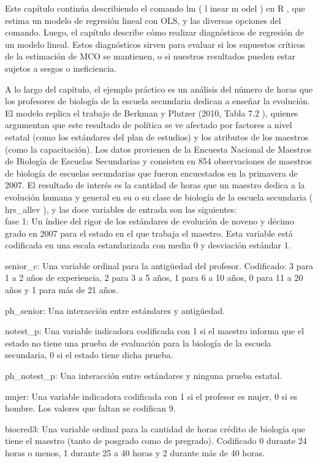 \documentclass[
]{book}
\begin{document}
Este capítulo continúa describiendo el comando lm ( l inear m odel ) en R , que estima un modelo de regresión lineal con OLS, y las diversas opciones del comando. Luego, el capítulo describe cómo realizar diagnósticos de regresión de un modelo lineal. Estos diagnósticos sirven para evaluar si los supuestos críticos de la estimación de MCO se mantienen, o si nuestros resultados pueden estar sujetos a sesgos o ineficiencia.

A lo largo del capítulo, el ejemplo práctico es un análisis del número de horas que los profesores de biología de la escuela secundaria dedican a enseñar la evolución. El modelo replica el trabajo de Berkman y Plutzer (2010, Tabla 7.2 ), quienes argumentan que este resultado de política se ve afectado por factores a nivel estatal (como los estándares del plan de estudios) y los atributos de los maestros (como la capacitación). Los datos provienen de la Encuesta Nacional de Maestros de Biología de Escuelas Secundarias y consisten en 854 observaciones de maestros de biología de escuelas secundarias que fueron encuestados en la primavera de 2007. El resultado de interés es la cantidad de horas que un maestro dedica a la evolución humana y general en su o su clase de biología de la escuela secundaria ( hrs\_allev ), y las doce variables de entrada son las siguientes:\\
fase 1:
Un índice del rigor de los estándares de evolución de noveno y décimo grado en 2007 para el estado en el que trabaja el maestro. Esta variable está codificada en una escala estandarizada con media 0 y desviación estándar 1.

senior\_c:
Una variable ordinal para la antigüedad del profesor. Codificado: 3 para 1 a 2 años de experiencia, 2 para 3 a 5 años, 1 para 6 a 10 años, 0 para 11 a 20 años y 1 para más de 21 años.

ph\_senior:
Una interacción entre estándares y antigüedad.

notest\_p:
Una variable indicadora codificada con 1 si el maestro informa que el estado no tiene una prueba de evaluación para la biología de la escuela secundaria, 0 si el estado tiene dicha prueba.

ph\_notest\_p:
Una interacción entre estándares y ninguna prueba estatal.

mujer:
Una variable indicadora codificada con 1 si el profesor es mujer, 0 si es hombre. Los valores que faltan se codifican 9.

biocred3:
Una variable ordinal para la cantidad de horas crédito de biología que tiene el maestro (tanto de posgrado como de pregrado). Codificado 0 durante 24 horas o menos, 1 durante 25 a 40 horas y 2 durante más de 40 horas.
\end{document}
